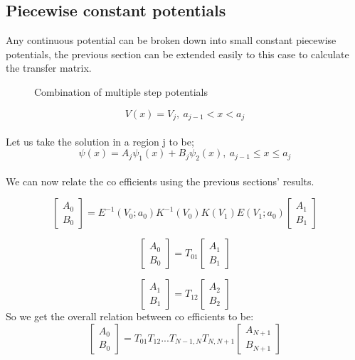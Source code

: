 \documentclass{article}
\begin{document}
\subsection{Piecewise constant potentials}
Any continuous potential can be broken down into small constant piecewise potentials, the previous section can be extended easily to this case to calculate the transfer matrix.
\begin{figure}[h!]
\caption{Combination of multiple step potentials}
\end{figure}

$$V(x) = V_j, \ a_{j-1} < x < a_{j}$$
\\
Let us take the solution in a region j to be;
$$\psi(x) = A_j\psi_1(x) + B_j\psi_2(x), \ a_{j-1} \leq x \leq a_j$$
\\
We can now relate the co efficients using the previous sections' results.

\[
\begin{bmatrix}
A_0 \\
B_0
\end{bmatrix}
= 
E^{-1}(V_0;a_0)K^{-1}(V_0)K(V_1)E(V_1;a_0)
\begin{bmatrix}
A_1 \\
B_1
\end{bmatrix}
\]

\[
\begin{bmatrix}
A_0 \\
B_0
\end{bmatrix}
= 
T_{01}
\begin{bmatrix}
A_1 \\
B_1
\end{bmatrix}
\]

\[
\begin{bmatrix}
A_1 \\
B_1
\end{bmatrix}
= 
T_{12}
\begin{bmatrix}
A_2 \\
B_2
\end{bmatrix}
\]
So we get the overall relation between co efficients to be: 
\[
\begin{bmatrix}
A_0 \\
B_0
\end{bmatrix}
= 
T_{01}T_{12}...T_{N-1,N}T_{N,N+1}
\begin{bmatrix}
A_{N+1} \\
B_{N+1}
\end{bmatrix}
\]
\end{document}
